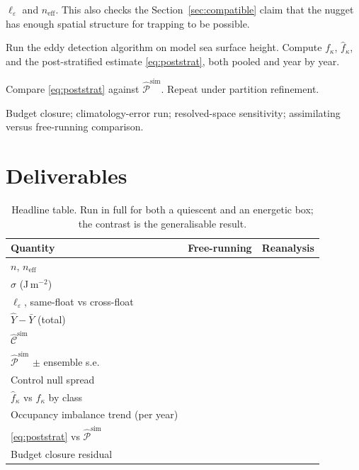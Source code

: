 \documentclass[11pt]{article}
\begin{document}
\begin{description}[leftmargin=*,style=nextline]
    $\ell_\varepsilon$ and $n_{\text{eff}}$. This also checks the Section~\ref{sec:compatible}
    claim that the nugget has enough spatial structure for trapping to be possible.
  \item[Stage 6 --- Eddy census.] Run the eddy detection algorithm on model sea surface height.
    Compute $f_\kappa$, $\hat{f}_\kappa$, and the post-stratified estimate
    \eqref{eq:poststrat}, both pooled and year by year.
  \item[Stage 7 --- Validation.] Compare \eqref{eq:poststrat} against
    $\widehat{\mathcal{P}}^{\text{sim}}$. Repeat under partition refinement.
  \item[Stage 8 --- Closure and sensitivities.] Budget closure; climatology-error run;
    resolved-space sensitivity; assimilating versus free-running comparison.
\end{description}

\section{Deliverables}
\label{sec:deliverables}

\begin{table}[h]
\centering
\begin{tabular}{lcc}
\toprule
Quantity & Free-running & Reanalysis \\
\midrule
$n$, $n_{\text{eff}}$ & & \\
$\sigma$ (J\,m$^{-2}$) & & \\
$\ell_\varepsilon$, same-float vs cross-float & & \\
$\hat{Y} - \bar{Y}$ (total) & & \\
$\widehat{\mathcal{C}}^{\text{sim}}$ & & \\
$\widehat{\mathcal{P}}^{\text{sim}}$ $\pm$ ensemble s.e. & & \\
Control null spread & & \\
$\hat{f}_\kappa$ vs $f_\kappa$ by class & & \\
Occupancy imbalance trend (per year) & & \\
\eqref{eq:poststrat} vs $\widehat{\mathcal{P}}^{\text{sim}}$ & & \\
Budget closure residual & & \\
\bottomrule
\end{tabular}
\caption{Headline table. Run in full for both a quiescent and an energetic box; the contrast is
the generalisable result.}
\end{table}
\end{document}
